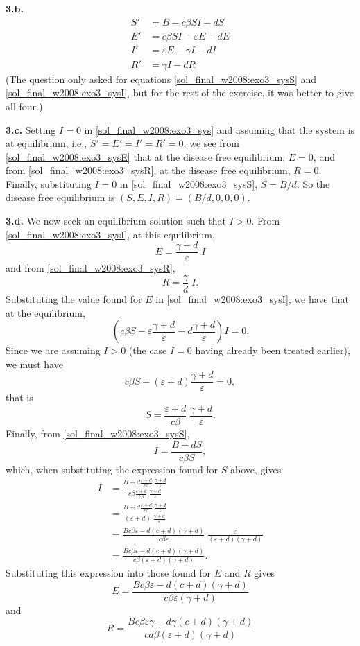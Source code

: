 \documentclass[12pt]{article}
\theoremstyle{plain}
\begin{document}
\textbf{3.b.}
\begin{subequations} \label{sol_final_w2008:exo3_sys}
\begin{align}
S' &= B-c\beta SI-dS \label{sol_final_w2008:exo3_sysS} \\
E' &= c\beta SI -\varepsilon E-dE \label{sol_final_w2008:exo3_sysE}\\
I' &= \varepsilon E-\gamma I-dI \label{sol_final_w2008:exo3_sysI}\\
R' &= \gamma I -dR \label{sol_final_w2008:exo3_sysR}
\end{align}
\end{subequations}
(The question only asked for equations \eqref{sol_final_w2008:exo3_sysS} and \eqref{sol_final_w2008:exo3_sysI}, but for the rest of the exercise, it was better to give all four.)

\textbf{3.c.}
Setting $I=0$ in \eqref{sol_final_w2008:exo3_sys} and assuming that the system is at equilibrium, i.e., $S'=E'=I'=R'=0$, we see from \eqref{sol_final_w2008:exo3_sysE} that at the disease free equilibrium, $E=0$, and from \eqref{sol_final_w2008:exo3_sysR}, at the disease free equilibrium, $R=0$. Finally, substituting $I=0$ in \eqref{sol_final_w2008:exo3_sysS}, $S=B/d$. So the disease free equilibrium is $(S,E,I,R)=(B/d,0,0,0)$.

\textbf{3.d.} 
We now seek an equilibrium solution such that $I>0$. From \eqref{sol_final_w2008:exo3_sysI}, at this equilibrium,
\[
E=\frac{\gamma+d}{\varepsilon}\;I
\]
and from \eqref{sol_final_w2008:exo3_sysR},
\[
R=\frac\gamma d\;I.
\]
Substituting the value found for $E$ in \eqref{sol_final_w2008:exo3_sysI}, we have that at the equilibrium,
\[
\left(c\beta S-\varepsilon\frac{\gamma+d}{\varepsilon}
-d\frac{\gamma+d}{\varepsilon}\right)I=0.
\]
Since we are assuming $I>0$ (the case $I=0$ having already been treated earlier), we must have
\[
c\beta S-(\varepsilon+d)\frac{\gamma+d}{\varepsilon}=0,
\]
that is
\[
S=\frac{\varepsilon+d}{c\beta}\;\frac{\gamma+d}{\varepsilon}.
\]
Finally, from \eqref{sol_final_w2008:exo3_sysS},
\[
I=\frac{B-dS}{c\beta S},
\]
which, when substituting the expression found for $S$ above, gives
\begin{align*}
I &=
\frac{B-d\frac{\varepsilon+d}{c\beta}\;\frac{\gamma+d}{\varepsilon}}
{c\beta\frac{\varepsilon+d}{c\beta}\;\frac{\gamma+d}{\varepsilon}} \\
&= \frac{B-d\frac{\varepsilon+d}{c\beta}\;\frac{\gamma+d}{\varepsilon}}
{(\varepsilon+d)\;\frac{\gamma+d}{\varepsilon}} \\
&=
\frac{Bc\beta\varepsilon-d(c+d)(\gamma+d)}{c\beta\varepsilon}\;
\frac{\varepsilon}{(\varepsilon+d)(\gamma+d)} \\
&=
\frac{Bc\beta\varepsilon-d(c+d)(\gamma+d)}{c\beta(\varepsilon+d)(\gamma+d)}.
\end{align*}
Substituting this expression into those found for $E$ and $R$ gives
\[
E=\frac{Bc\beta\varepsilon-d(c+d)(\gamma+d)}{c\beta\varepsilon(\gamma+d)}
\]
and
\[
R=\frac{Bc\beta\varepsilon\gamma-d\gamma(c+d)(\gamma+d)}{cd\beta(\varepsilon+d)(\gamma+d)}
\]
\end{document}
